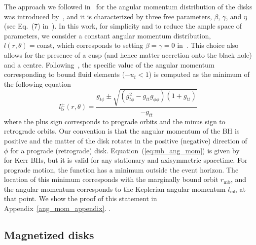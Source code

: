 \documentclass[twocolumn,aps,showpacs,showkeys,prd,superscriptaddress,byrevtex, amsmath]{revtex4-1}
\begin{document}
The approach we followed in~\cite{Gimeno-Soler:2017} for the angular momentum distribution of the disks was introduced by~\cite{Qian:2009}, and it is characterized by three free parameters, $\beta$, $\gamma$, and $\eta$ (see Eq.~(7) in~\cite{Gimeno-Soler:2017}). In this work, for simplicity and to reduce the ample space of parameters, we consider a constant angular momentum distribution, $l(r,\theta) = \mathrm{const}$, which corresponds to setting $\beta=\gamma=0$ in~\cite{Gimeno-Soler:2017}. This choice also allows for the presence of a cusp (and hence matter accretion onto the black hole) and a centre.   Following~\citep{Daigne:2004}, the specific value of the angular momentum corresponding to bound fluid elements ($-u_t<1$) is computed as the minimum of the following equation
\begin{equation}\label{eq:mb_ang_mom}
l^{\pm}_{\mathrm{b}}(r, \theta) = \frac{g_{t\phi} \pm \sqrt{ (g_{t\phi}^2-g_{tt}g_{\phi\phi})  (1+g_{tt}) } }{-g_{tt}}
\end{equation}
where the plus sign corresponds to prograde orbits and the minus sign to retrograde orbits. Our convention is that the angular momentum of the BH is positive and the matter of the disk rotates in the positive (negative) direction of $\phi$ for a prograde (retrograde) disk.
Equation~(\ref{eq:mb_ang_mom}) is given by~\citep{Daigne:2004} for Kerr BHs, but it is valid for any stationary and axisymmetric spacetime. For prograde motion, the function has a minimum outside the event horizon. The location of this minimum corresponds with the marginally bound orbit $r_{\mathrm{mb}}$, and the angular momentum corresponds to the Keplerian angular momentum $l_{\mathrm{mb}}$ at that point. We show the proof of this statement in Appendix~\ref{ang_mom_appendix}. .

\subsection{Magnetized disks}
\end{document}
